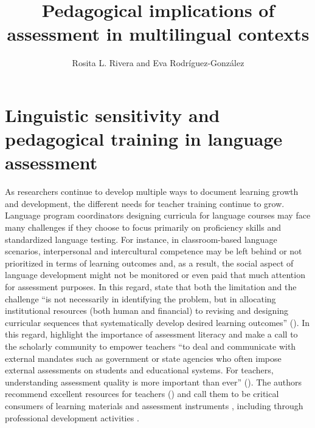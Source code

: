 \documentclass[output=paper]{langscibook}
\author{Rosita L. Rivera\affiliation{University of Puerto Rico-Mayagüez} and Eva Rodríguez-González\affiliation{University of New Mexico}}
\title{Pedagogical implications of assessment in multilingual contexts}
\begin{document}
\maketitle



\section{Linguistic sensitivity and pedagogical training in language assessment}

As researchers continue to develop multiple ways to document learning growth and development, the different needs for teacher training continue to grow. Language program coordinators designing curricula for language courses may face many challenges if they choose to focus primarily on proficiency skills and standardized language testing. For instance, in classroom-based language scenarios, interpersonal and intercultural competence may be left behind or not prioritized in terms of learning outcomes and, as a result, the social aspect of language development might not be monitored or even paid that much attention for assessment purposes. In this regard, \citet{MenkeMalovhr2021} state that both the limitation and the challenge “is not necessarily in identifying the problem, but in allocating institutional resources (both human and financial) to revising and designing curricular sequences that systematically develop desired learning outcomes” (\citeyear[500]{MenkeMalovrh2021}). In this regard, \citet{PhakitiIsaacs2021} highlight the importance of assessment literacy and make a call to the scholarly community to empower teachers “to deal and communicate with external mandates such as government or state agencies who often impose external assessments on students and educational systems. For teachers, understanding assessment quality is more important than ever” (\citeyear[19]{PhakitiIsaacs2021}).  The authors recommend excellent resources for teachers (\citeyear[Appendix A]{PhakitiIsaacs2021}) and call them to be critical consumers of learning materials and assessment instruments \citep{BrownTrace2017}, including through professional development activities \citep{HardingKremmel2017}.
\end{document}
